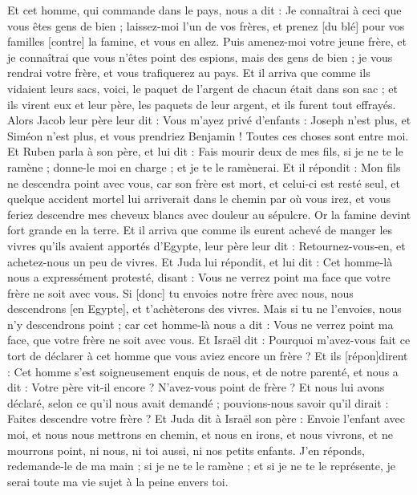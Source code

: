 \begin{multicols}{2}
Et cet homme, qui commande dans le pays, nous a dit : Je connaîtrai à ceci que vous êtes gens de bien ; laissez-moi l'un de vos frères, et prenez [du blé] pour vos familles [contre] la famine, et vous en allez.
Puis amenez-moi votre jeune frère, et je connaîtrai que vous n'êtes point des espions, mais des gens de bien ; je vous rendrai votre frère, et vous trafiquerez au pays.
Et il arriva que comme ils vidaient leurs sacs, voici, le paquet de l'argent de chacun était dans son sac ; et ils virent eux et leur père, les paquets de leur argent, et ils furent tout effrayés.
Alors Jacob leur père leur dit : Vous m'ayez privé d'enfants : Joseph n'est plus, et Siméon n'est plus, et vous prendriez Benjamin ! Toutes ces choses sont entre moi.
Et Ruben parla à son père, et lui dit : Fais mourir deux de mes fils, si je ne te le ramène ; donne-le moi en charge ; et je te le ramènerai.
Et il répondit : Mon fils ne descendra point avec vous, car son frère est mort, et celui-ci est resté seul, et quelque accident mortel lui arriverait dans le chemin par où vous irez, et vous feriez descendre mes cheveux blancs avec douleur au sépulcre.
\VerseOne{}Or la famine devint fort grande en la terre.
Et il arriva que comme ils eurent achevé de manger les vivres qu'ils avaient apportés d'Egypte, leur père leur dit : Retournez-vous-en, et achetez-nous un peu de vivres.
Et Juda lui répondit, et lui dit : Cet homme-là nous a expressément protesté, disant : Vous ne verrez point ma face que votre frère ne soit avec vous.
Si [donc] tu envoies notre frère avec nous, nous descendrons [en Egypte], et t'achèterons des vivres.
Mais si tu ne l'envoies, nous n'y descendrons point ; car cet homme-là nous a dit : Vous ne verrez point ma face, que votre frère ne soit avec vous.
Et Israël dit : Pourquoi m'avez-vous fait ce tort de déclarer à cet homme que vous aviez encore un frère ?
Et ils [répon]dirent : Cet homme s'est soigneusement enquis de nous, et de notre parenté, et nous a dit : Votre père vit-il encore ? N'avez-vous point de frère ? Et nous lui avons déclaré, selon ce qu'il nous avait demandé ; pouvions-nous savoir qu'il dirait : Faites descendre votre frère ?
Et Juda dit à Israël son père : Envoie l'enfant avec moi, et nous nous mettrons en chemin, et nous en irons, et nous vivrons, et ne mourrons point, ni nous, ni toi aussi, ni nos petits enfants.
J'en réponds, redemande-le de ma main ; si je ne te le ramène ; et si je ne te le représente, je serai toute ma vie sujet à la peine envers toi.

\end{multicols}
